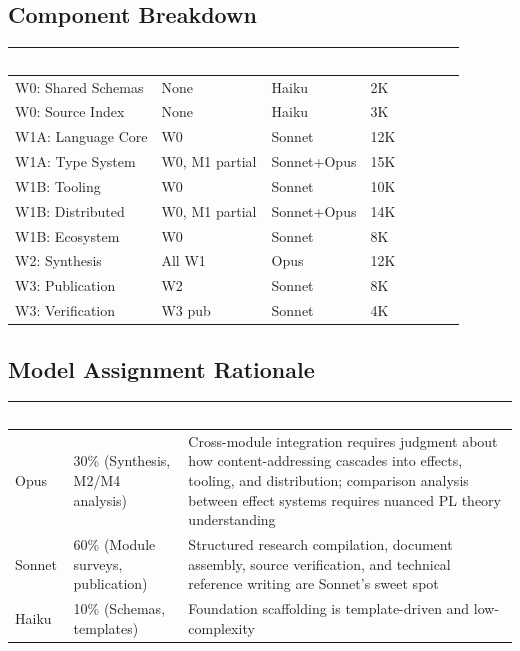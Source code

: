 \documentclass[11pt,letterpaper]{article}
\newcommand{\tableheader}[1]{\textbf{\sffamily\textcolor{white}{#1}}}
\begin{document}
\subsection{Component Breakdown}

\begin{center}
\begin{tabularx}{\textwidth}{L{3.5cm}L{2.5cm}C{1.5cm}C{2cm}}
\toprule
{}
\tableheader{Component} & \tableheader{Dependencies} & \tableheader{Model} & \tableheader{Est. Tokens} \\
\midrule
W0: Shared Schemas & None & Haiku & 2K \\
W0: Source Index & None & Haiku & 3K \\
W1A: Language Core & W0 & Sonnet & 12K \\
W1A: Type System & W0, M1 partial & Sonnet+Opus & 15K \\
W1B: Tooling & W0 & Sonnet & 10K \\
W1B: Distributed & W0, M1 partial & Sonnet+Opus & 14K \\
W1B: Ecosystem & W0 & Sonnet & 8K \\
W2: Synthesis & All W1 & Opus & 12K \\
W3: Publication & W2 & Sonnet & 8K \\
W3: Verification & W3 pub & Sonnet & 4K \\
\bottomrule
\end{tabularx}
\end{center}

\subsection{Model Assignment Rationale}

\begin{center}
\begin{tabularx}{\textwidth}{C{1.5cm}L{3cm}X}
\toprule
{}
\tableheader{Model} & \tableheader{Allocation} & \tableheader{Rationale} \\
\midrule
Opus & 30\% (Synthesis, M2/M4 analysis) & Cross-module integration requires judgment about how content-addressing cascades into effects, tooling, and distribution; comparison analysis between effect systems requires nuanced PL theory understanding \\
Sonnet & 60\% (Module surveys, publication) & Structured research compilation, document assembly, source verification, and technical reference writing are Sonnet's sweet spot \\
Haiku & 10\% (Schemas, templates) & Foundation scaffolding is template-driven and low-complexity \\
\bottomrule
\end{tabularx}
\end{center}
\end{document}
